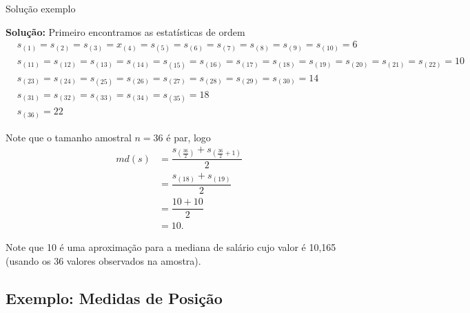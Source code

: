 \documentclass[8pt]{beamer}
\begin{document}
\begin{frame}{Solução exemplo}
  
  \textbf{Solução:} Primeiro encontramos as estatísticas de ordem
  \begin{align*}
   &s_{(1)} = s_{(2)}=s_{(3)}=x_{(4)}=s_{(5)}=s_{(6)}=s_{(7)}=s_{(8)}=s_{(9)}=s_{(10)}=6\\
   &s_{(11)} = s_{(12)}=s_{(13)}=s_{(14)}=s_{(15)}=s_{(16)}=s_{(17)}=s_{(18)}=s_{(19)}=s_{(20)}=s_{(21)}=s_{(22)}=10\\
   &s_{(23)} = s_{(24)}=s_{(25)}=s_{(26)}=s_{(27)}=s_{(28)}=s_{(29)}=s_{(30)}=14\\
   &s_{(31)} = s_{(32)}=s_{(33)}=s_{(34)}=s_{(35)}=18\\
   &s_{(36)} = 22
  \end{align*}
 
 Note que o tamanho amostral $n=36$ é par, logo
 \begin{align*}
  md(s)&=\dfrac{ s_{\left(\frac{36}{2}\right)}+s_{\left(\frac{36}{2}+1\right)}}{2}\\
  &=\dfrac{ s_{(18)}+s_{(19)}}{2}\\
  &= \dfrac{10+10}{2}\\
  &=10.
 \end{align*}
 
 {\color{blue} Note que 10 é uma aproximação para a mediana de salário cujo valor é 10,165 (usando os 36 valores observados na amostra). }
\end{frame}

\subsection{Exemplo: Medidas de Posição}
\end{document}
